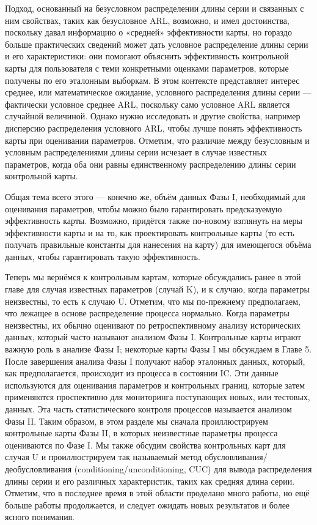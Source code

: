 Подход, основанный на безусловном распределении длины серии и связанных с ним свойствах, таких как безусловное ARL, возможно, и имел достоинства, поскольку давал информацию о «средней» эффективности карты, но гораздо больше практических сведений может дать условное распределение длины серии и его характеристики: они помогают объяснить эффективность контрольной карты для пользователя с теми конкретными оценками параметров, которые получены по его эталонным выборкам. В этом контексте представляет интерес среднее, или математическое ожидание, условного распределения длины серии — фактически условное среднее ARL, поскольку само условное ARL является случайной величиной. Однако нужно исследовать и другие свойства, например дисперсию распределения условного ARL, чтобы лучше понять эффективность карты при оценивании параметров. Отметим, что различие между безусловным и условным распределениями длины серии исчезает в случае известных параметров, когда оба они равны единственному распределению длины серии контрольной карты.

Общая тема всего этого — конечно же, объём данных Фазы I, необходимый для оценивания параметров, чтобы можно было гарантировать предсказуемую эффективность карты. Возможно, придётся также по-новому взглянуть на меры эффективности карты и на то, как проектировать контрольные карты (то есть получать правильные константы для нанесения на карту) для имеющегося объёма данных, чтобы гарантировать такую эффективность.

Теперь мы вернёмся к контрольным картам, которые обсуждались ранее в этой главе для случая известных параметров (случай K), и к случаю, когда параметры неизвестны, то есть к случаю U. Отметим, что мы по-прежнему предполагаем, что лежащее в основе распределение процесса нормально. Когда параметры неизвестны, их обычно оценивают по ретроспективному анализу исторических данных, который часто называют анализом Фазы I. Контрольные карты играют важную роль в анализе Фазы I; некоторые карты Фазы I мы обсуждаем в Главе 5. После завершения анализа Фазы I получают набор эталонных данных, который, как предполагается, происходит из процесса в состоянии IC. Эти данные используются для оценивания параметров и контрольных границ, которые затем применяются проспективно для мониторинга поступающих новых, или тестовых, данных. Эта часть статистического контроля процессов называется анализом Фазы II. Таким образом, в этом разделе мы сначала проиллюстрируем контрольные карты Фазы II, в которых неизвестные параметры процесса оцениваются по Фазе I. Мы также обсудим свойства контрольных карт для случая U и проиллюстрируем так называемый метод обусловливания/деобусловливания (conditioning/unconditioning, CUC) для вывода распределения длины серии и его различных характеристик, таких как средняя длина серии. Отметим, что в последнее время в этой области проделано много работы, но ещё больше работы продолжается, и следует ожидать новых результатов и более ясного понимания.

